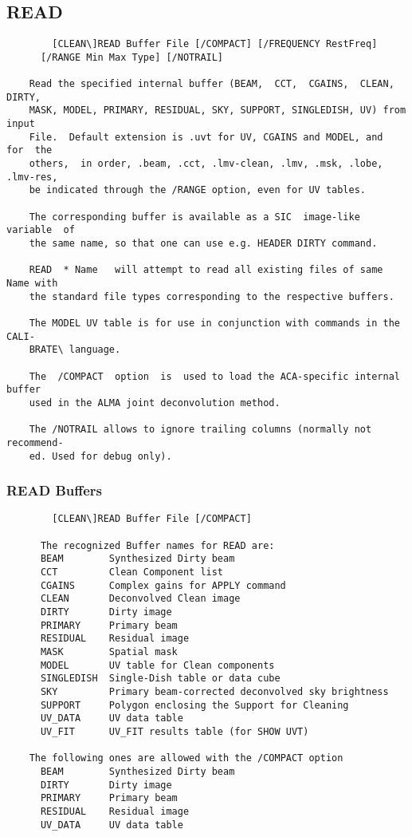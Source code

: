 \subsection{READ}
\begin{verbatim}
        [CLEAN\]READ Buffer File [/COMPACT] [/FREQUENCY RestFreq]
      [/RANGE Min Max Type] [/NOTRAIL]

    Read the specified internal buffer (BEAM,  CCT,  CGAINS,  CLEAN,  DIRTY,
    MASK, MODEL, PRIMARY, RESIDUAL, SKY, SUPPORT, SINGLEDISH, UV) from input
    File.  Default extension is .uvt for UV, CGAINS and MODEL, and  for  the
    others,  in order, .beam, .cct, .lmv-clean, .lmv, .msk, .lobe, .lmv-res,
    be indicated through the /RANGE option, even for UV tables.

    The corresponding buffer is available as a SIC  image-like  variable  of
    the same name, so that one can use e.g. HEADER DIRTY command.

    READ  * Name   will attempt to read all existing files of same Name with
    the standard file types corresponding to the respective buffers.

    The MODEL UV table is for use in conjunction with commands in the  CALI-
    BRATE\ language.

    The  /COMPACT  option  is  used to load the ACA-specific internal buffer
    used in the ALMA joint deconvolution method.

    The /NOTRAIL allows to ignore trailing columns (normally not  recommend-
    ed. Used for debug only).

\end{verbatim}
\subsubsection{READ Buffers}
\begin{verbatim}
        [CLEAN\]READ Buffer File [/COMPACT]

      The recognized Buffer names for READ are:
      BEAM        Synthesized Dirty beam
      CCT         Clean Component list
      CGAINS      Complex gains for APPLY command
      CLEAN       Deconvolved Clean image
      DIRTY       Dirty image
      PRIMARY     Primary beam
      RESIDUAL    Residual image
      MASK        Spatial mask
      MODEL       UV table for Clean components
      SINGLEDISH  Single-Dish table or data cube
      SKY         Primary beam-corrected deconvolved sky brightness
      SUPPORT     Polygon enclosing the Support for Cleaning
      UV_DATA     UV data table
      UV_FIT      UV_FIT results table (for SHOW UVT)

    The following ones are allowed with the /COMPACT option
      BEAM        Synthesized Dirty beam
      DIRTY       Dirty image
      PRIMARY     Primary beam
      RESIDUAL    Residual image
      UV_DATA     UV data table

\end{verbatim}
